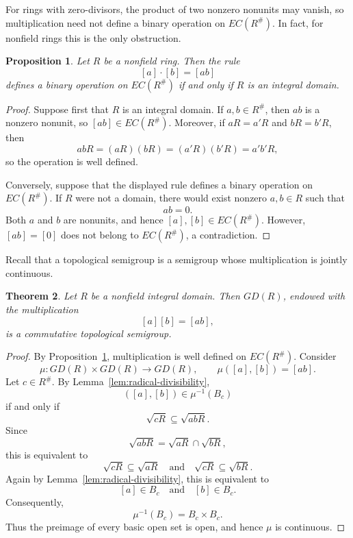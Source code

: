 \documentclass[11pt]{amsart}
\theoremstyle{plain}
\newtheorem{theorem}{Theorem}[section]
\newtheorem{proposition}[theorem]{Proposition}
\theoremstyle{definition}
\theoremstyle{remark}
\numberwithin{equation}{section}
\begin{document}
For rings with zero-divisors, the product of two nonzero nonunits may
vanish, so multiplication need not define a binary operation on
$EC(R^\#)$. In fact, for nonfield rings this is the only obstruction.

\begin{proposition}\label{prop:multiplication-domain}
	Let $R$ be a nonfield ring. Then the rule
	\[
	[a]\cdot[b]=[ab]
	\]
	defines a binary operation on $EC(R^\#)$ if and only if $R$ is an
	integral domain.
\end{proposition}

\begin{proof}
	Suppose first that $R$ is an integral domain. If $a,b\in R^\#$, then
	$ab$ is a nonzero nonunit, so $[ab]\in EC(R^\#)$. Moreover, if
	$aR=a'R$ and $bR=b'R$, then
	\[
	abR=(aR)(bR)=(a'R)(b'R)=a'b'R,
	\]
	so the operation is well defined.
	
	Conversely, suppose that the displayed rule defines a binary operation
	on $EC(R^\#)$. If $R$ were not a domain, there would exist nonzero
	$a,b\in R$ such that
	\[
	ab=0.
	\]
	Both $a$ and $b$ are nonunits, and hence $[a],[b]\in EC(R^\#)$.
	However, $[ab]=[0]$ does not belong to $EC(R^\#)$, a contradiction.
\end{proof}

Recall that a topological semigroup is a semigroup whose multiplication
is jointly continuous.

\begin{theorem}\label{thm:topological-semigroup}
	Let $R$ be a nonfield integral domain. Then $GD(R)$, endowed with the
	multiplication
	\[
	[a][b]=[ab],
	\]
	is a commutative topological semigroup.
\end{theorem}

\begin{proof}
	By Proposition~\ref{prop:multiplication-domain}, multiplication is
	well defined on $EC(R^\#)$. Consider
	\[
	\mu:GD(R)\times GD(R)\longrightarrow GD(R),
	\qquad
	\mu([a],[b])=[ab].
	\]
	Let $c\in R^\#$. By Lemma~\ref{lem:radical-divisibility},
	\[
	([a],[b])\in\mu^{-1}(B_c)
	\]
	if and only if
	\[
	\sqrt{cR}\subseteq\sqrt{abR}.
	\]
	Since
	\[
	\sqrt{abR}
	=
	\sqrt{aR}\cap\sqrt{bR},
	\]
	this is equivalent to
	\[
	\sqrt{cR}\subseteq\sqrt{aR}
	\quad\text{and}\quad
	\sqrt{cR}\subseteq\sqrt{bR}.
	\]
	Again by Lemma~\ref{lem:radical-divisibility}, this is equivalent to
	\[
	[a]\in B_c
	\quad\text{and}\quad
	[b]\in B_c.
	\]
	Consequently,
	\[
	\mu^{-1}(B_c)=B_c\times B_c.
	\]
	Thus the preimage of every basic open set is open, and hence
	$\mu$ is continuous.
\end{proof}
\end{document}

